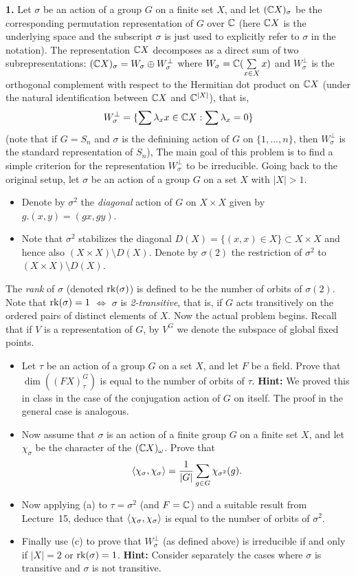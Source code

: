 \documentclass[11pt]{amsart}
\begin{document}
\skv
{\bf 1.} Let $\sigma$ be an action of a group $G$ on a finite set $X$, and let $({\mathbb C} X)_{\sigma}$ be the corresponding
permutation representation of $G$ over ${\mathbb C}$ (here ${\mathbb C} X$ is the underlying space and the subscript $\sigma$ is just
used to explicitly refer to $\sigma$ in the notation). The representation ${\mathbb C} X$ decomposes as a direct sum of two subrepresentations:
$({\mathbb C} X)_{\sigma} = W_{\sigma}\oplus W_{\sigma}^{\perp}$ where $W_{\sigma}={\mathbb C}(\sum\limits_{x\in X}x)$ and $
W_{\sigma}^{\perp}$ is the orthogonal complement
with respect to the Hermitian dot product on ${\mathbb C} X$ (under the natural identification between ${\mathbb C} X$ and ${\mathbb C}^{|X|}$),
that is, $$W_{\sigma}^{\perp}=\{\sum {\lambda}_x x\in {\mathbb C} X: \sum {\lambda}_x =0\}$$ (note that if $G=S_n$ and $\sigma$ is the definining action
of $G$ on $\{1,\ldots, n\}$, then $W_{\sigma}^{\perp}$ is the standard representation of $S_n$), The main goal of this problem is to
find a simple criterion for the representation $W_{\sigma}^{\perp}$ to be irreducible.
\skv
Going back to the original setup, let $\sigma$ be an action of a group $G$ on a set $X$ with $|X|>1$. 
\begin{itemize}
\item Denote by $\sigma^2$ the {\it diagonal} action of $G$ on $X\times X$ given by $g.(x,y)=(gx,gy)$.  
\item Note that $\sigma^2$ stabilizes the diagonal $D(X)=\{(x,x)\in X\}\subset X\times X$ and hence also 
$(X\times X)\setminus D(X)$. Denote by $\sigma(2)$ the restriction of $\sigma^2$ to $(X\times X)\setminus D(X)$.
\end{itemize}
The {\it rank} of $\sigma$ (denoted ${\rm rk}(\sigma)$) is defined to be the number of orbits of $\sigma(2)$.
Note that ${\rm rk}(\sigma)=1$ $\iff$ $\sigma$ is {\it 2-transitive}, that is, if $G$ acts transitively 
on the ordered pairs of distinct elements of $X$.
\skv
Now the actual problem begins. Recall that if $V$ is a representation of $G$, by $V^G$ we denote the subspace of global fixed points.
\begin{itemize}
\item[(a)] Let  $\tau$ be an action of a group $G$ on a set $X$, and let $F$ be a field.
Prove that $\dim((FX)_{\tau}^G)$ is equal to the number of orbits of $\tau$. {\bf Hint:} We proved this in class in the case of 
the conjugation action of $G$ on itself. The proof in the general case is analogous.
\item[(b)] Now assume that $\sigma$ is an action of a finite group $G$ on a finite set $X$, and let
$\chi_{\sigma}$ be the character of the $({\mathbb C} X)_{\omega}$. Prove that 
$${\langle} \chi_{\sigma},\chi_{\sigma}{\rangle}=\frac{1}{|G|}\sum\limits_{g\in G}\chi_{\sigma^2}(g).$$
\item[(c)] Now applying (a) to $\tau=\sigma^2$ (and $F={\mathbb C}$) and a suitable result from Lecture~15, deduce
that ${\langle} \chi_{\sigma},\chi_{\sigma}{\rangle}$ is equal to the number of orbits of $\sigma^2$. 
\item[(d)] Finally use (c) to prove that $W^{\perp}_{\sigma}$ (as defined above)
is irreducible if and only if $|X|=2$ or ${\rm rk}(\sigma)=1$. {\bf Hint:} Consider separately the cases where
$\sigma$ is transitive and $\sigma$ is not transitive.
\end{itemize}
\end{document}
